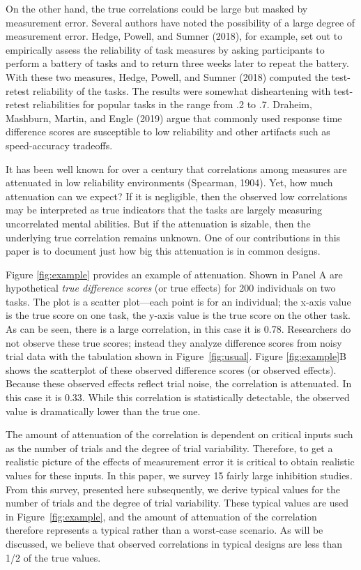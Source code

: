 \documentclass[
  english,
  ,man]{apa6}
\begin{document}
On the other hand, the true correlations could be large but masked by measurement error. Several authors have noted the possibility of a large degree of measurement error. Hedge, Powell, and Sumner (2018), for example, set out to empirically assess the reliability of task measures by asking participants to perform a battery of tasks and to return three weeks later to repeat the battery. With these two measures, Hedge, Powell, and Sumner (2018) computed the test-retest reliability of the tasks. The results were somewhat disheartening with test-retest reliabilities for popular tasks in the range from .2 to .7. Draheim, Mashburn, Martin, and Engle (2019) argue that commonly used response time difference scores are susceptible to low reliability and other artifacts such as speed-accuracy tradeoffs.

It has been well known for over a century that correlations among measures are attenuated in low reliability environments (Spearman, 1904). Yet, how much attenuation can we expect? If it is negligible, then the observed low correlations may be interpreted as true indicators that the tasks are largely measuring uncorrelated mental abilities. But if the attenuation is sizable, then the underlying true correlation remains unknown. One of our contributions in this paper is to document just how big this attenuation is in common designs.

Figure \ref{fig:example} provides an example of attenuation. Shown in Panel A are hypothetical \emph{true difference scores} (or true effects) for 200 individuals on two tasks. The plot is a scatter plot---each point is for an individual; the x-axis value is the true score on one task, the y-axis value is the true score on the other task. As can be seen, there is a large correlation, in this case it is 0.78.
Researchers do not observe these true scores; instead they analyze difference scores from noisy trial data with the tabulation shown in Figure~\ref{fig:usual}. Figure \ref{fig:example}B shows the scatterplot of these observed difference scores (or observed effects). Because these observed effects reflect trial noise, the correlation is attenuated. In this case it is 0.33. While this correlation is statistically detectable, the observed value is dramatically lower than the true one.

The amount of attenuation of the correlation is dependent on critical inputs such as the number of trials and the degree of trial variability. Therefore, to get a realistic picture of the effects of measurement error it is critical to obtain realistic values for these inputs. In this paper, we survey 15 fairly large inhibition studies. From this survey, presented here subsequently, we derive typical values for the number of trials and the degree of trial variability. These typical values are used in Figure~\ref{fig:example}, and the amount of attenuation of the correlation therefore represents a typical rather than a worst-case scenario. As will be discussed, we believe that observed correlations in typical designs are less than 1/2 of the true values.
\end{document}
